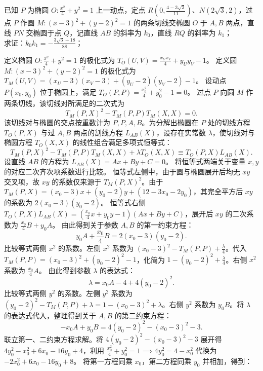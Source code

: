 \begin{exercise}
已知 \(P\) 为椭圆 \(O: \frac{x^2}{4} + y^2 = 1\) 上一动点，定点 \(R\left(0, \frac{4 - 3\sqrt{3}}{11}\right)\)、\(N\left(2\sqrt{3}, 2\right)\)，过点 \(P\) 作圆 \(M: (x - 3)^2 + (y - 2)^2 = 1\) 的两条切线交椭圆 \(O\) 于 \(A,B\) 两点，直线 \(PN\) 交椭圆于点 \(Q\)，记直线 \(AB\) 的斜率为 \(k_0\)，直线 \(RQ\) 的斜率为 \(k_1\)；\\
求证：\(k_0 k_1 = -\frac{3\sqrt{3} + 18}{88}\)；
\end{exercise}
\begin{solution}
定义椭圆 $O: \frac{x^2}{4} + y^2 = 1$ 的极化式为 $T_O(U, V) = \frac{x_U x_V}{4} + y_U y_V - 1$。
定义圆 $M: (x - 3)^2 + (y - 2)^2 = 1$ 的极化式为 $T_M(U, V) = (x_U - 3)(x_V - 3) + (y_U - 2)(y_V - 2) - 1$。
设动点 $P(x_0, y_0)$ 位于椭圆上，满足 $T_O(P, P) = \frac{x_0^2}{4} + y_0^2 - 1 = 0$。
过点 $P$ 向圆 $M$ 作两条切线，该切线对所满足的二次式为
\[ T_M(P, X)^2 - T_M(P, P) T_M(X, X) = 0. \]
该切线对与椭圆的交点按重数计为 $P,P,A,B$。为分解出椭圆在 $P$ 处的切线方程 $T_O(P, X)$ 与过 $A,B$ 两点的割线方程 $L_{AB}(X)$，设存在实常数 $\lambda$，使切线对与椭圆方程 $T_O(X, X)$ 的线性组合满足多项式恒等式：
\[ T_M(P, X)^2 - T_M(P, P) T_M(X, X) + \lambda T_O(X, X) \equiv T_O(P, X) L_{AB}(X). \]
设直线 $AB$ 的方程为 $L_{AB}(X) = Ax + By + C = 0$。
将恒等式两端关于变量 $x, y$ 的对应二次齐次项系数进行比较。
恒等式左侧中，由于圆与椭圆展开后均无 $xy$ 交叉项，故 $xy$ 的系数仅来源于 $T_M(P, X)^2$。由于 $T_M(P, X) = (x_0 - 3)x + (y_0 - 2)y + (12 - 3x_0 - 2y_0)$，其完全平方后 $xy$ 的系数为 $2(x_0 - 3)(y_0 - 2)$。
恒等式右侧 $T_O(P, X) L_{AB}(X) = \left(\frac{x_0}{4}x + y_0 y - 1\right)(Ax + By + C)$，展开后 $xy$ 的二次系数为 $\frac{x_0}{4} B + y_0 A$。
由此得到关于参数 $A, B$ 的第一约束方程：
\[ y_0 A + \frac{x_0}{4} B = 2(x_0 - 3)(y_0 - 2). \]
比较等式两侧 $x^2$ 的系数。左侧 $x^2$ 系数为 $(x_0 - 3)^2 - T_M(P, P) + \frac{\lambda}{4}$。代入 $T_M(P, P) = (x_0 - 3)^2 + (y_0 - 2)^2 - 1$，化简为 $1 - (y_0 - 2)^2 + \frac{\lambda}{4}$。右侧 $x^2$ 系数为 $\frac{x_0}{4} A$。
由此得到参数 $\lambda$ 的表达式：
\[ \lambda = x_0 A - 4 + 4(y_0 - 2)^2. \]
比较等式两侧 $y^2$ 的系数。左侧 $y^2$ 系数为 $(y_0 - 2)^2 - T_M(P, P) + \lambda = 1 - (x_0 - 3)^2 + \lambda$。右侧 $y^2$ 系数为 $y_0 B$。将 $\lambda$ 的表达式代入，整理得到关于 $A, B$ 的第二约束方程：
\[ -x_0 A + y_0 B = 4(y_0 - 2)^2 - (x_0 - 3)^2 - 3. \]
联立第一、二约束方程求解。将 $4(y_0 - 2)^2 - (x_0 - 3)^2 - 3$ 展开得 $4y_0^2 - x_0^2 + 6x_0 - 16y_0 + 4$，利用 $\frac{x_0^2}{4} + y_0^2 = 1 \implies 4y_0^2 = 4 - x_0^2$ 代换为 $-2x_0^2 + 6x_0 - 16y_0 + 8$。
将第一方程同乘 $x_0$，第二方程同乘 $y_0$ 并相加，得到：

\end{solution}
